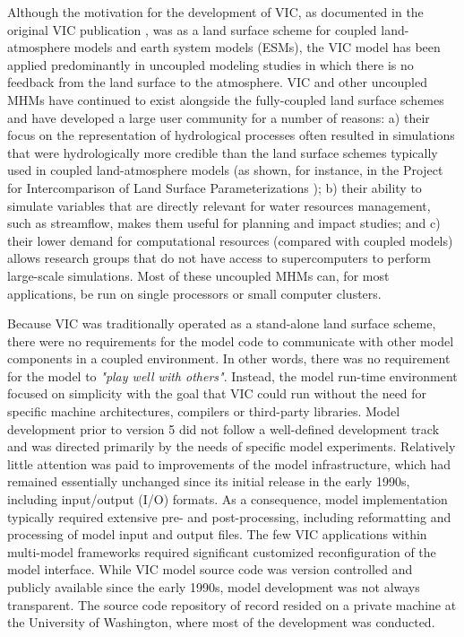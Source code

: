 \documentclass[gmd, manuscript]{copernicus}
\begin{document}
  Although the motivation for the development of VIC, as documented in the original VIC publication \citep{Liang_1994}, was as a land surface scheme for coupled land-atmosphere models and earth system models (ESMs), the VIC model has been applied predominantly in uncoupled modeling studies in which there is no feedback from the land surface to the atmosphere. VIC and other uncoupled MHMs have continued to exist alongside the fully-coupled land surface schemes and have developed a large user community for a number of reasons: a) their focus on the representation of hydrological processes often resulted in simulations that were hydrologically more credible than the land surface schemes typically used in coupled land-atmosphere models (as shown, for instance, in the Project for Intercomparison of Land Surface Parameterizations \citep[PILPS;][]{Bowling_2003,wood_1998}); b) their ability to simulate variables that are directly relevant for water resources management, such as streamflow, makes them useful for planning and impact studies; and c) their lower demand for computational resources (compared with coupled models) allows research groups that do not have access to supercomputers to perform large-scale simulations. Most of these uncoupled MHMs can, for most applications, be run on single processors or small computer clusters.

  Because VIC was traditionally operated as a stand-alone land surface scheme, there were no requirements for the model code to communicate with other model components in a coupled environment. In other words, there was no requirement for the model to \textit{"play well with others"}. Instead, the model run-time environment focused on simplicity with the goal that VIC could run without the need for specific machine architectures, compilers or third-party libraries. Model development prior to version 5 did not follow a well-defined development track and was directed primarily by the needs of specific model experiments. Relatively little attention was paid to improvements of the model infrastructure, which had remained essentially unchanged since its initial release in the early 1990s, including input/output (I/O) formats. As a consequence, model implementation typically required extensive pre- and post-processing, including reformatting and processing of model input and output files. The few VIC applications within multi-model frameworks \citep[e.g. NASA LIS, ][]{Kumar_2006} required significant customized reconfiguration of the model interface. While VIC model source code was version controlled and publicly available since the early 1990s, model development was not always transparent. The source code repository of record resided on a private machine at the University of Washington, where most of the development was conducted.
\end{document}
